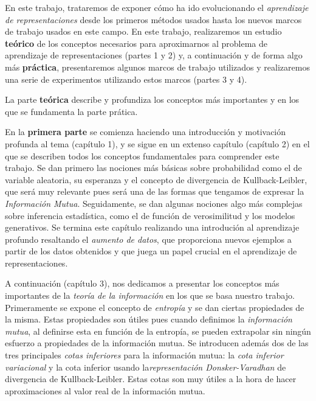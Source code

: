 En este trabajo, trataremos de exponer cómo ha ido evolucionando el \emph{aprendizaje de representaciones} desde los primeros métodos usados hasta los nuevos marcos de trabajo usados en este campo. En este trabajo, realizaremos un estudio \textbf{teórico} de los conceptos necesarios para aproximarnos al problema de aprendizaje de representaciones (partes 1 y 2) y, a continuación y de forma algo más \textbf{práctica}, presentaremos algunos marcos de trabajo utilizados y realizaremos una serie de experimentos utilizando estos marcos (partes 3 y 4).

La parte \textbf{teórica} describe y profundiza los conceptos más importantes y en los que se fundamenta la parte prática.

En la \textbf{primera parte} se comienza haciendo una introducción y motivación profunda al tema (capítulo 1), y se sigue en un extenso capítulo (capítulo 2) en el que se describen todos los conceptos fundamentales para comprender este trabajo. Se dan primero las nociones más básicas sobre probabilidad como el de variable aleatoria, su esperanza y el concepto de {divergencia de Kullback-Leibler}, que será muy relevante pues será una de las formas que tengamos de expresar la \emph{Información Mutua}. Seguidamente, se dan algunas nociones algo más complejas sobre inferencia estadística, como el de función de verosimilitud y los modelos generativos. Se termina este capítulo realizando una  introdución al aprendizaje profundo  resaltando el \emph{aumento de datos}, que proporciona nuevos ejemplos a partir de los datos obtenidos y que juega un papel crucial en el aprendizaje de representaciones.

A continuación (capítulo 3), nos dedicamos a presentar  los conceptos más importantes de la \emph{teoría de la información} en los que se basa nuestro trabajo. Primeramente se expone el concepto de  \emph{entropía} y se dan ciertas propiedades de la misma. Estas propiedades son útiles pues cuando definimos la \emph{información mutua}, al definirse esta en función de la entropía, se pueden extrapolar sin ningún esfuerzo a propiedades de la información mutua. Se introducen además dos de las tres principales \emph{cotas inferiores} para la información mutua: la \emph{cota inferior variacional} y la cota inferior usando la\emph{representación Donsker-Varadhan} de divergencia de Kullback-Leibler. Estas cotas son muy útiles a la hora de hacer aproximaciones al valor real de la información mutua.


